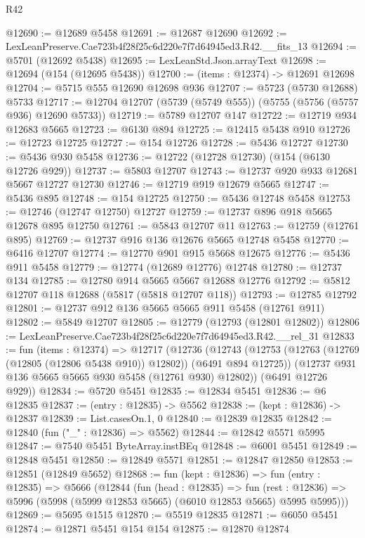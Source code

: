 \begin{lexlean}{R42}
\begin{coremodule}
@12690 := @12689 @5458
@12691 := @12687 @12690
@12692 := LexLeanPreserve.Cae723b4f28f25c6d220e7f7d64945ed3.R42.__fits_13
@12694 := @5701 (@12692 @5438)
@12695 := LexLeanStd.Json.arrayText
@12698 := @12694 (@154 (@12695 @5438))
@12700 := (items : @12374) -> @12691 @12698
@12704 := @5715 @555 @12690 @12698 @936
@12707 := @5723 (@5730 @12688) @5733
@12717 := @12704 @12707 (@5739 (@5749 @555)) (@5755 (@5756 (@5757 @936) @12690 @5733))
@12719 := @5789 @12707 @147
@12722 := @12719 @934 @12683 @5665
@12723 := @6130 @894
@12725 := @12415 @5438 @910
@12726 := @12723 @12725
@12727 := @154 @12726
@12728 := @5436 @12727
@12730 := @5436 @930 @5458
@12736 := @12722 (@12728 @12730) (@154 (@6130 @12726 @929))
@12737 := @5803 @12707
@12743 := @12737 @920 @933 @12681 @5667 @12727 @12730
@12746 := @12719 @919 @12679 @5665
@12747 := @5436 @895
@12748 := @154 @12725
@12750 := @5436 @12748 @5458
@12753 := @12746 (@12747 @12750) @12727
@12759 := @12737 @896 @918 @5665 @12678 @895 @12750
@12761 := @5843 @12707 @11
@12763 := @12759 (@12761 @895)
@12769 := @12737 @916 @136 @12676 @5665 @12748 @5458
@12770 := @6416 @12707
@12774 := @12770 @901 @915 @5668 @12675
@12776 := @5436 @911 @5458
@12779 := @12774 (@12689 @12776) @12748
@12780 := @12737 @134
@12785 := @12780 @914 @5665 @5667 @12688 @12776
@12792 := @5812 @12707 @118 @12688 (@5817 (@5818 @12707 @118))
@12793 := @12785 @12792
@12801 := @12737 @912 @136 @5665 @5665 @911 @5458 (@12761 @911)
@12802 := @5849 @12707
@12805 := @12779 (@12793 (@12801 @12802))
@12806 := LexLeanPreserve.Cae723b4f28f25c6d220e7f7d64945ed3.R42.__rel_31
@12833 := fun (items : @12374) =>
  @12717
    (@12736
      (@12743
        (@12753 (@12763 (@12769 (@12805 (@12806 @5438 @910)) @12802)) (@6491 @894 @12725))
        (@12737 @931 @136 @5665 @5665 @930 @5458 (@12761 @930) @12802))
      (@6491 @12726 @929))
@12834 := @5720 @5451
@12835 := @12834 @5451
@12836 := @6 @12835
@12837 := (entry : @12835) -> @5562
@12838 := (kept : @12836) -> @12837
@12839 := List.casesOn.{1, 0}
@12840 := @12839 @12835
@12842 := @12840 (fun ("_" : @12836) => @5562)
@12844 := @12842 @5571 @5995
@12847 := @7540 @5451 ByteArray.instBEq
@12848 := @6001 @5451
@12849 := @12848 @5451
@12850 := @12849 @5571
@12851 := @12847 @12850
@12853 := @12851 (@12849 @5652)
@12868 := fun (kept : @12836) =>
  fun (entry : @12835) =>
  @5666
    (@12844
      (fun (head : @12835) =>
      fun (rest : @12836) => @5996 (@5998 (@5999 @12853 @5665) (@6010 @12853 @5665) @5995 @5995)))
@12869 := @5695 @1515
@12870 := @5519 @12835
@12871 := @6050 @5451
@12874 := @12871 @5451 @154 @154
@12875 := @12870 @12874

\end{coremodule}
\end{lexlean}
